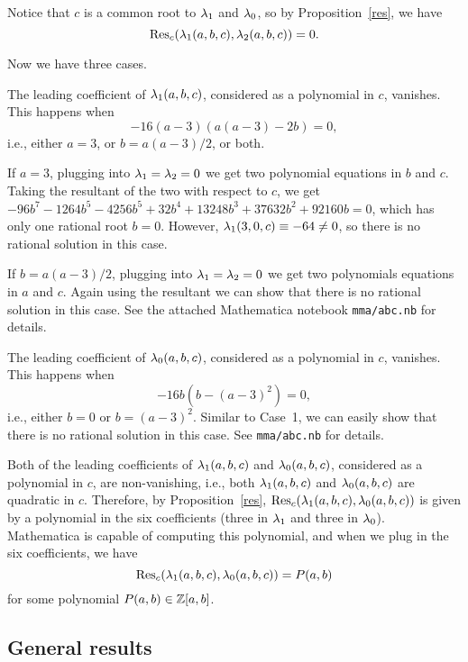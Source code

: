 Notice that $c$ is a common root to $\lambda_1$ and $\lambda_0$, so by
Proposition~\ref{res}, we have
\[
\mathrm{Res}_c(\lambda_1(a, b, c), \lambda_2(a, b, c)) = 0.
\]

Now we have three cases.

\begin{case}
  The leading coefficient of $\lambda_1(a, b, c)$, considered as a
  polynomial in $c$, vanishes. This happens when
  \[
  -16(a - 3)(a(a-3) - 2b) = 0,
  \]
  i.e., either $a = 3$, or $b = a(a-3)/2$, or both.

  If $a = 3$, plugging into $\lambda_1 = \lambda_2 = 0$ we get two polynomial
  equations in $b$ and $c$. Taking the resultant of the two with
  respect to $c$, we get $- 96b^7 - 1264b^5 - 4256b^5 + 32b^4 +
  13248b^3 + 37632b^2 + 92160b = 0$, which has only one rational root
  $b = 0$. However, $\lambda_1(3, 0, c) \equiv -64 \ne 0$, so there is no
  rational solution in this case.

  If $b = a(a-3)/2$, plugging into $\lambda_1 = \lambda_2 = 0$ we get two
  polynomials equations in $a$ and $c$. Again using the resultant we
  can show that there is no rational solution in this case. See the
  attached Mathematica notebook \texttt{mma/abc.nb} for details.
\end{case}

\begin{case}
  The leading coefficient of $\lambda_0(a, b, c)$, considered as a
  polynomial in $c$, vanishes. This happens when
  \[
  -16b(b - (a-3)^2) = 0,
  \]
  i.e., either $b = 0$ or $b = (a - 3)^2$. Similar to Case~1, we can
  easily show that there is no rational solution in this case. See
  \texttt{mma/abc.nb} for details.
\end{case}

\begin{case}
  Both of the leading coefficients of $\lambda_1(a, b, c)$ and $\lambda_0(a, b,
  c)$, considered as a polynomial in $c$, are non-vanishing, i.e.,
  both $\lambda_1(a, b, c)$ and $\lambda_0(a, b, c)$ are quadratic in
  $c$. Therefore, by Proposition~\ref{res}, $\mathrm{Res}_c(\lambda_1(a, b, c),
  \lambda_0(a, b, c))$ is given by a polynomial in the six coefficients
  (three in $\lambda_1$ and three in $\lambda_0$). Mathematica is capable of
  computing this polynomial, and when we plug in the six coefficients,
  we have
  \[
  \mathrm{Res}_c(\lambda_1(a, b, c), \lambda_0(a, b, c)) = P(a, b)
  \]
  for some polynomial $P(a, b) \in \mathbb{Z}[a, b]$.
\end{case}

\subsection{General results}
\label{subsec:general}

